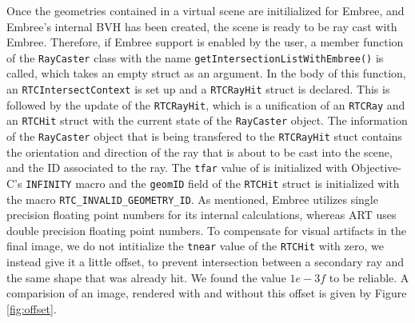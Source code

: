 Once the geometries contained in a virtual scene are initilialized for Embree, and Embree's internal BVH has been created, the scene is ready to be ray cast with Embree. Therefore, if Embree support is enabled by the user, a member function of the \texttt{RayCaster} class with the name \texttt{getIntersectionListWithEmbree()} is called, which takes an empty  struct  as an argument. In the body of this function, an \texttt{RTCIntersectContext}  is set up and a \texttt{RTCRayHit} struct is declared.
This is followed by the update of the \texttt{RTCRayHit}, which is a unification of an \texttt{RTCRay} and an \texttt{RTCHit} struct with the current state of the \texttt{RayCaster} object. The information of the \texttt{RayCaster} object that is being transfered to the \texttt{RTCRayHit} stuct contains the orientation and direction of the ray that is about to be cast into the scene, and the ID associated to the ray. The \texttt{tfar} value of is initialized with Objective-C's \texttt{INFINITY} macro and the \texttt{geomID} field of the \texttt{RTCHit} struct is initialized with the macro \texttt{RTC\_INVALID\_GEOMETRY\_ID}. As mentioned,  Embree utilizes single precision floating point numbers for its internal calculations, whereas ART uses double precision floating point numbers. To compensate for visual artifacts in the final image, we do not intitialize the \texttt{tnear} value of the \texttt{RTCHit} with zero, we instead give it a little offset, to prevent intersection between a secondary ray and the same shape that was already hit. We found the value $1e-3f$ to be reliable. A comparision of an image, rendered with and without this offset is given by Figure \ref{fig:offset}.

